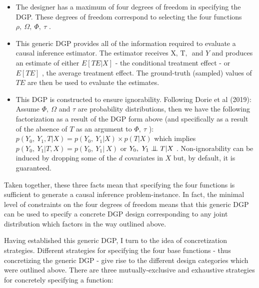 \documentclass[../main.tex]{subfiles}
\begin{document}
\vspace{\baselineskip}
\begin{itemize}
	\item The designer has a maximum of four degrees of freedom in specifying the DGP. These degrees of freedom correspond to selecting the four functions  \(  \rho ,~ \Omega ,~ \Phi ,~ \tau \) .\par


\vspace{\baselineskip}
	\item This generic DGP provides all of the information required to evaluate a causal inference estimator. The estimator receives  \( \text{X, T, } \) and \( Y \) and produces an estimate of either  \( E \left[ TE  \vert  X \right]  \)  - the conditional treatment effect - or  \( E \left[ TE \right]  \) , the average treatment effect. The ground-truth (sampled) values of  \( TE \) are then be used to evaluate the estimates. \par


\vspace{\baselineskip}
	\item This DGP is constructed to ensure ignorability. Following Dorie et al (2019): Assume  \(  \Phi ,~ \Omega  \)  and  \(  \tau \) are probability distributions, then we have the following factorization as a result of the DGP form above (and specifically as a result of the absence of  \( T \) as an argument to  \(  \Phi ,~ \tau \) ):  \( p \left( Y_{0},~Y_{1}, T  \vert  X \right)  = p \left( Y_{0},~Y_{1} \vert  X \right)  \times p \left( T \vert X \right)  \)  which implies  \(  p \left( Y_{0},~Y_{1} \vert  T, X \right)  = p \left( Y_{0},~Y_{1} \vert ~ X \right)  \)  or  \( Y_{0},~Y_{1} \bigCI T  \vert  X \) . Non-ignorability can be induced by dropping some of the  \( d \)  covariates in  \( X \)  but, by default, it is guaranteed.
\end{itemize}\par


\vspace{\baselineskip}
Taken together, these three facts mean that specifying the four functions is sufficient to generate a causal inference problem-instance. In fact, the minimal level of constraints on the four degrees of freedom means that this generic DGP can be used to specify a concrete DGP design corresponding to any joint distribution which factors in the way outlined above.\par


\vspace{\baselineskip}
Having established this generic DGP, I turn to the idea of concretization strategies. Different strategies for specifying the four base functions - thus concretizing the generic DGP - give rise to the different design categories which were outlined above. There are three mutually-exclusive and exhaustive strategies for concretely specifying a function:\par
\end{document}
